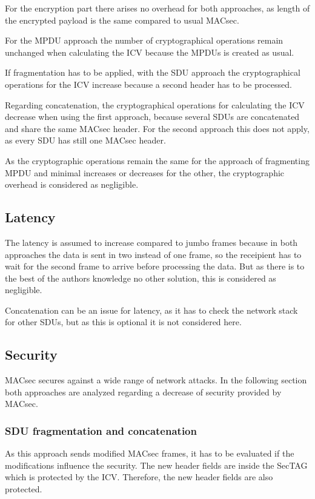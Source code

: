 For the encryption part there arises no overhead for both approaches, as length of the encrypted payload is the same compared to usual \gls{MACsec}.

For the \gls{MPDU} approach the number of cryptographical operations remain unchanged when calculating the \gls{ICV} because the \glspl{MPDU}  is created as usual.

If fragmentation has to be applied, with the \gls{SDU} approach the cryptographical operations for the \gls{ICV} increase because a second header has to be processed.

Regarding concatenation, the cryptographical operations for calculating the \gls{ICV} decrease when using the first approach, because several \glspl{SDU} are concatenated and share the same \gls{MACsec} header.
For the second approach this does not apply, as every \gls{SDU} has still one \gls{MACsec} header.

As the cryptographic operations remain the same for the approach of fragmenting \gls{MPDU} and minimal increases or decreases for the other, the cryptographic overhead is considered as negligible.

\subsection{Latency}
The latency is assumed to increase compared to jumbo frames because in both approaches the data is sent in two instead of one frame, so the receipient has to wait for the second frame to arrive before processing the data.
But as there is to the best of the authors knowledge no other solution, this is considered as negligible.

Concatenation can be an issue for latency, as it has to check the network stack for other \glspl{SDU}, but as this is optional it is not considered here.

\subsection{Security}
\label{sec:design-security}
\gls{MACsec} secures against a wide range of network attacks.
In the following section both approaches are analyzed regarding a decrease of security provided by \gls{MACsec}.

\subsubsection{SDU fragmentation and concatenation}
As this approach sends modified \gls{MACsec} frames, it has to be evaluated if the modifications influence the security.
The new header fields are inside the \gls{SecTAG} which is protected by the \gls{ICV}.
Therefore, the new header fields are also protected.

